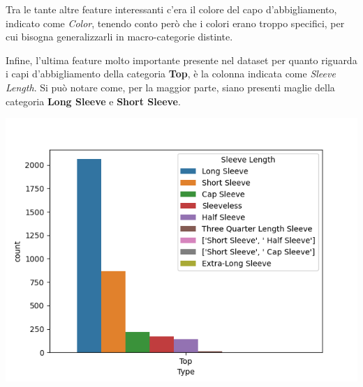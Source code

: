 \documentclass[a4paper, 11pt, oneside]{report}
\begin{document}
                \bigskip
                \par \noindent Tra le tante altre feature interessanti c'era il colore del capo d'abbigliamento, indicato
                come \textit{Color}, tenendo conto però che i colori erano troppo specifici, per cui bisogna
                generalizzarli in macro-categorie distinte.
                \\
                \par \noindent Infine, l'ultima feature molto importante presente nel dataset per quanto riguarda i capi
                d'abbigliamento della categoria \textbf{Top}, è la colonna indicata come \textit{Sleeve Length}. Si può
                notare come, per la maggior parte, siano presenti maglie della categoria \textbf{Long Sleeve} e
                \textbf{Short Sleeve}.
                \begin{center}
                    \includegraphics[scale=0.4]{countLengthTop}
                \end{center}
                \newpage
\end{document}
